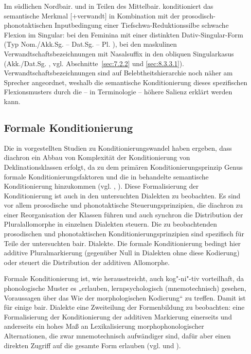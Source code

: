 Im südlichen Nordbair. und in Teilen des Mittelbair. konditioniert das semantische Merkmal [+verwandt] in Kombination mit der prosodisch-phonotaktischen Inputbedingung einer Tiefschwa-Reduktionssilbe schwache Flexion im Singular: bei den Feminina mit einer distinkten Dativ-Singular-Form (Typ Nom./Akk.Sg.  -- Dat.Sg.  -- Pl. ), bei den maskulinen Verwandtschaftsbezeichnungen mit Nasalsuffix in den obliquen Singularkasus (Akk./Dat.Sg. , vgl. Abschnitte~\ref{sec:7.2.2} und \ref{sec:8.3.3.1}). Verwandtschaftsbezeichnungen sind auf  Belebtheitshierarchie noch näher am Sprecher angeordnet, weshalb die semantische Konditionierung dieses spezifischen Flexionsmusters durch die -- in  Terminologie -- höhere Salienz erklärt werden kann.

\subsection{Formale Konditionierung}\label{sec:8.3.3}
\begin{sloppypar}
Die in  vorgestellten Studien zu Konditionierungswandel haben ergeben, dass diachron ein Abbau von Komplexität der Konditionierung von Deklinationsklassen erfolgt, da zu dem primären Konditionierungsprinzip Genus formale Konditionierungsfaktoren und die in  behandelte semantische Konditionierung hinzukommen (vgl. \citealt{DammelKürschner2008}, \citealt{Kürschner2008a}). Diese Formalisierung der Konditionierung ist auch in den untersuchten Dialekten zu beobachten. Es sind vor allem prosodische und phonotaktische Steuerungsprinzipien, die diachron zu einer Reorganisation der Klassen führen und auch synchron die Distribution der Pluralallomorphe in einzelnen Dialekten steuern. Die zu beobachtenden prosodischen und phonotaktischen Konditionierungsprinzipien sind spezifisch für Teile der untersuchten bair. Dialekte. Die formale Konditionierung bedingt hier additive Pluralmarkierung (gegenüber Null in Dialekten ohne diese Kodierung) oder steuert die Distribution der additiven Allomorphe.
\end{sloppypar}

Formale Konditionierung ist, wie \citet[33]{Harnisch1987} herausstreicht, auch kog"-ni"-tiv vorteilhaft, da phonologische Muster es „erlauben, lernpsychologisch (mnemotechnisch) gesehen, Voraussagen über das Wie der morphologischen Kodierung“ zu treffen. Damit ist für einige bair. Dialekte eine Zweiteilung der Formenbildung zu beobachten: eine Formalisierung der Konditionierung der additiven Markierung einerseits und anderseits ein hohes Maß an Lexikalisierung morphophonologischer Alternationen, die zwar mnemotechnisch aufwändiger sind, dafür aber einen direkten Zugriff auf die gesamte Form erlauben (vgl. \citealt[59]{Harnisch1990} und ).

